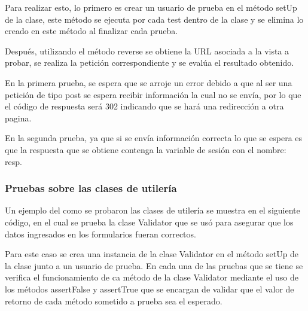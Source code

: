 Para realizar esto, lo primero es crear un usuario de prueba en el método setUp  de la clase, este método se ejecuta por cada test dentro de la clase y se elimina lo creado en este método al finalizar cada prueba.

Después, utilizando el método reverse se obtiene la URL asociada a la vista a probar, se realiza la petición correspondiente y se evalúa el resultado obtenido.



En la primera prueba, se espera que se arroje un error debido a que al ser una petición de tipo post se espera recibir información la cual no se envía, por lo que el código de respuesta será 302 indicando que se hará una redirección a otra pagina.

En la segunda prueba, ya que si se envía información correcta lo que se espera es que la respuesta que se obtiene contenga la variable de sesión con el nombre: resp.

\subsubsection{Pruebas sobre las clases de utilería}

Un ejemplo del como se probaron las clases de utilería se muestra en el siguiente código, en el cual se prueba la clase Validator que se usó para asegurar que los datos ingresados en los formularios fueran correctos.

Para este caso se crea una instancia de la clase Validator en el método setUp de la clase junto a un usuario de prueba. En cada una de las pruebas que se tiene se verifica el funcionamiento de ca método de la clase Validator mediante el uso de los métodos assertFalse y assertTrue que se encargan de validar que el valor de retorno de cada método sometido a prueba sea el esperado.


